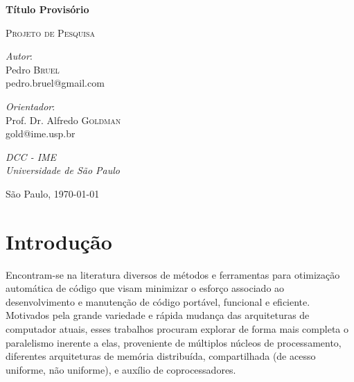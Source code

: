 \documentclass[a4paper, 11pt]{article}
\begin{document}
\hypersetup{backref,pdfpagemode=FullScreen,colorlinks=true}

\thispagestyle{empty}
\begin{center}
    \vspace*{1cm}
    \textbf{\Large{Título Provisório}}\\

    \vskip 1cm

    \textsc{Projeto de Pesquisa}

    \vskip 1cm

    \begin{minipage}{.4\linewidth}
        \begin{flushleft}
            \emph{Autor}: \\Pedro \textsc{Bruel}\\
            pedro.bruel@gmail.com
        \end{flushleft}
    \end{minipage}
    \begin{minipage}{.4\linewidth}
        \begin{flushright}
            \emph{Orientador}: \\Prof. Dr. Alfredo \textsc{Goldman}\\
            gold@ime.usp.br
        \end{flushright}
    \end{minipage}

    \vskip 1cm

    \normalsize{\emph{DCC - IME\\
    Universidade de São Paulo}\\}

    \vskip 2cm
    \begin{abstract}
    \rule{\linewidth}{.1mm} \\
    \rule{\linewidth}{.1mm} \\
    \end{abstract}

    \vfill
    \normalsize{São Paulo, \today}
\end{center}

\newpage
\tableofcontents
\newpage

\section{Introdução}

Encontram-se na literatura diversos de métodos e ferramentas para otimização 
automática de código que visam minimizar o esforço associado ao desenvolvimento
e manutenção de código portável, funcional e eficiente. Motivados pela grande
variedade e rápida mudança das arquiteturas de computador atuais, esses 
trabalhos procuram explorar de forma mais completa o paralelismo inerente a
elas, proveniente de múltiplos núcleos de processamento, 
diferentes arquiteturas de memória distribuída, compartilhada (de acesso 
uniforme, não uniforme), e auxílio de coprocessadores.
\end{document}
